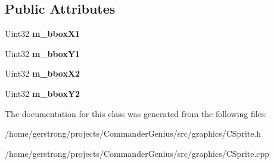 \subsection*{Public Attributes}
\begin{DoxyCompactItemize}
\item 
\hypertarget{class_c_sprite_a0a6d7d5427cd89b11637902dd702466c}{
Uint32 {\bfseries m\_\-bboxX1}}
\label{class_c_sprite_a0a6d7d5427cd89b11637902dd702466c}

\item 
\hypertarget{class_c_sprite_ac7f9419048ec1d2805bb93dbac70e12a}{
Uint32 {\bfseries m\_\-bboxY1}}
\label{class_c_sprite_ac7f9419048ec1d2805bb93dbac70e12a}

\item 
\hypertarget{class_c_sprite_aa6d4b35f6d44ac1b8c9d6cb46792c4da}{
Uint32 {\bfseries m\_\-bboxX2}}
\label{class_c_sprite_aa6d4b35f6d44ac1b8c9d6cb46792c4da}

\item 
\hypertarget{class_c_sprite_a27a47b5b026032ec09af7729fb0e0b1c}{
Uint32 {\bfseries m\_\-bboxY2}}
\label{class_c_sprite_a27a47b5b026032ec09af7729fb0e0b1c}

\end{DoxyCompactItemize}


The documentation for this class was generated from the following files:\begin{DoxyCompactItemize}
\item 
/home/gerstrong/projects/CommanderGenius/src/graphics/CSprite.h\item 
/home/gerstrong/projects/CommanderGenius/src/graphics/CSprite.cpp\end{DoxyCompactItemize}

